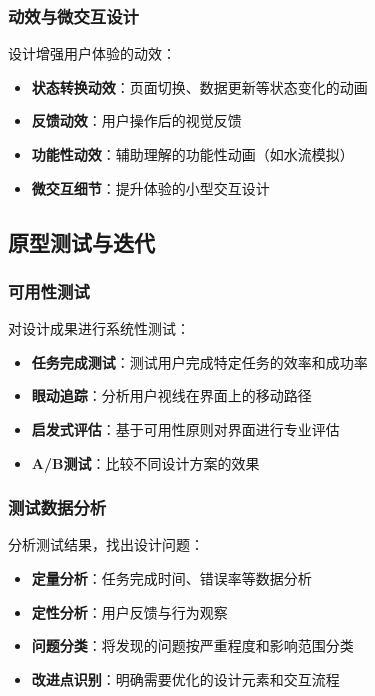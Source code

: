 \subsubsection{动效与微交互设计}\label{ux52a8ux6548ux4e0eux5faeux4ea4ux4e92ux8bbeux8ba1}

设计增强用户体验的动效：

\begin{itemize}
\tightlist
\item
  \textbf{状态转换动效}：页面切换、数据更新等状态变化的动画
\item
  \textbf{反馈动效}：用户操作后的视觉反馈
\item
  \textbf{功能性动效}：辅助理解的功能性动画（如水流模拟）
\item
  \textbf{微交互细节}：提升体验的小型交互设计
\end{itemize}

\subsection{原型测试与迭代}\label{ux539fux578bux6d4bux8bd5ux4e0eux8fedux4ee3}

\subsubsection{可用性测试}\label{ux53efux7528ux6027ux6d4bux8bd5}

对设计成果进行系统性测试：

\begin{itemize}
\tightlist
\item
  \textbf{任务完成测试}：测试用户完成特定任务的效率和成功率
\item
  \textbf{眼动追踪}：分析用户视线在界面上的移动路径
\item
  \textbf{启发式评估}：基于可用性原则对界面进行专业评估
\item
  \textbf{A/B测试}：比较不同设计方案的效果
\end{itemize}

\subsubsection{测试数据分析}\label{ux6d4bux8bd5ux6570ux636eux5206ux6790}

分析测试结果，找出设计问题：

\begin{itemize}
\tightlist
\item
  \textbf{定量分析}：任务完成时间、错误率等数据分析
\item
  \textbf{定性分析}：用户反馈与行为观察
\item
  \textbf{问题分类}：将发现的问题按严重程度和影响范围分类
\item
  \textbf{改进点识别}：明确需要优化的设计元素和交互流程
\end{itemize}


